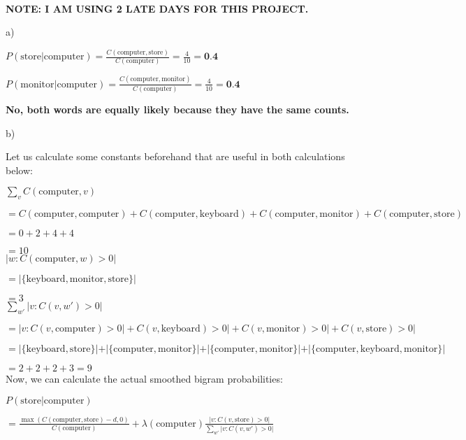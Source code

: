 \begin{solution} \ \\
\textbf{NOTE: I AM USING 2 LATE DAYS FOR THIS PROJECT.}	
	
a)

$P(\text{store} \vert \text{computer}) = \frac{C(\text{computer}, \text{store})}{C(\text{computer})} = \frac{4}{10} = \textbf{0.4}$

$P(\text{monitor} \vert \text{computer}) = \frac{C(\text{computer}, \text{monitor})}{C(\text{computer})} = \frac{4}{10} = \textbf{0.4}$

\textbf{No, both words are equally likely because they have the same counts.}

b)

Let us calculate some constants beforehand that are useful in both calculations below:

$\sum_v C(\text{computer}, v) $

$= C(\text{computer}, \text{computer}) + C(\text{computer}, \text{keyboard}) + C(\text{computer}, \text{monitor}) + C(\text{computer}, \text{store}) $

$= 0 + 2 + 4 + 4 $

$= 10$\\

$\vert w : C(\text{computer}, w) > 0\vert $

$= \vert\{\text{keyboard}, \text{monitor}, \text{store}\}\vert $

$= 3$\\

$\sum_{w'} \vert v : C(v, w') > 0 \vert $

$= \vert v : C(v, \text{computer}) > 0 \vert + C(v, \text{keyboard}) > 0 \vert + C(v, \text{monitor}) > 0 \vert + C(v, \text{store}) > 0 \vert $

\small$= \vert\{\text{keyboard}, \text{store}\}\vert + \vert\{\text{computer}, \text{monitor}\}\vert + \vert\{\text{computer}, \text{monitor}\}\vert + \vert\{\text{computer}, \text{keyboard}, \text{monitor}\}\vert $

\normalsize$= 2 + 2 + 2 + 3 = 9$\\

Now, we can calculate the actual smoothed bigram probabilities:

$P(\text{store} \vert \text{computer}) $

$= \frac{\max(C(\text{computer}, \text{store}) - d, 0)}{C(\text{computer})} + \lambda(\text{computer})\frac{\vert v : C(v, \text{store}) > 0\vert}{\sum_{w'} \vert v : C(v, w') > 0 \vert}$


\end{solution}
